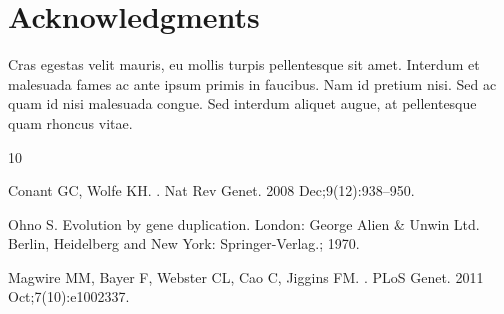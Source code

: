 \documentclass[10pt,letterpaper]{article}
\begin{document}


\section*{Acknowledgments}
Cras egestas velit mauris, eu mollis turpis pellentesque sit amet. Interdum et malesuada fames ac ante ipsum primis in faucibus. Nam id pretium nisi. Sed ac quam id nisi malesuada congue. Sed interdum aliquet augue, at pellentesque quam rhoncus vitae.

\nolinenumbers

%
%
% 
\begin{thebibliography}{10}

Conant GC, Wolfe KH.
.
\newblock Nat Rev Genet. 2008 Dec;9(12):938--950.

Ohno S.
\newblock Evolution by gene duplication.
\newblock London: George Alien \& Unwin Ltd. Berlin, Heidelberg and New York:
  Springer-Verlag.; 1970.

Magwire MM, Bayer F, Webster CL, Cao C, Jiggins FM.
.
\newblock PLoS Genet. 2011 Oct;7(10):e1002337.

\end{thebibliography}
\end{document}
